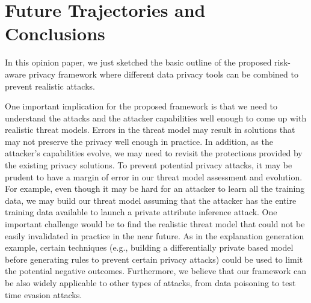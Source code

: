 \documentclass{article}
\begin{document}
\section{Future Trajectories and Conclusions}
In this opinion paper, we just sketched the basic outline of the proposed risk-aware privacy framework where different data privacy tools can be combined to prevent realistic attacks.

One important implication for the proposed framework is that we need to understand the attacks and the attacker capabilities well enough to come up with realistic threat models.
Errors in the threat model may result in solutions that may not preserve the privacy well enough in practice. In addition, as the attacker's capabilities evolve, we may need to revisit the protections provided by the existing privacy solutions. To prevent potential privacy attacks, it may be prudent to have a margin of error in our threat model assessment and evolution. For example, even though it may be hard for an attacker to learn all the training data, we may build our threat model assuming that the attacker has the entire training data available to launch a private attribute inference attack. One important challenge would be to find the realistic threat model that could not be easily invalidated in practice in the near future.  As in the explanation generation example, certain techniques  (e.g., building a differentially private based model before generating rules to prevent certain privacy attacks) could be used to limit the potential negative outcomes. Furthermore, we believe that our framework can be also widely applicable to other types of attacks, from data poisoning \cite{mustafa-aaai2021} to test time evasion attacks. 
\end{document}
